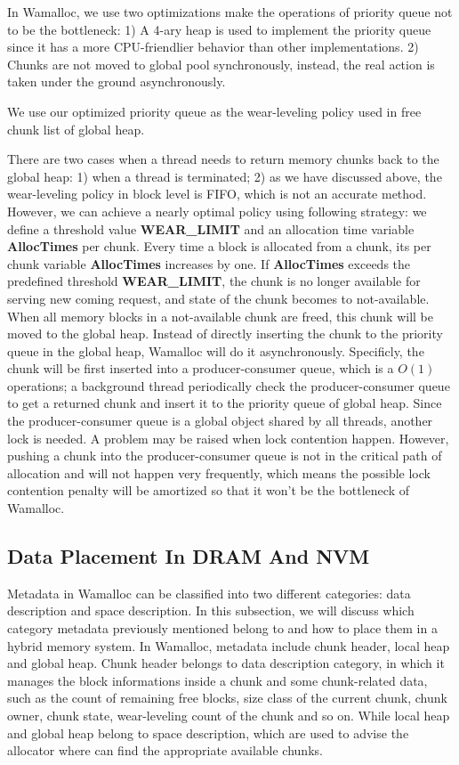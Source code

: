\documentclass[10pt, conference, compsocconf]{IEEEtran}
\begin{document}
In Wamalloc, we use two optimizations make the operations of priority queue not to be the bottleneck:
1) A 4-ary heap is used to implement the priority queue since it has a more CPU-friendlier behavior than other implementations.
2) Chunks are not moved to global pool synchronously, instead, the real action is taken under the ground asynchronously.

We use our optimized priority queue as the wear-leveling policy used in free chunk list of global heap.

There are two cases when a thread needs to return memory chunks back to the global heap: 
1) when a thread is terminated;
2) as we have discussed above, the wear-leveling policy in block level is FIFO, which is not an accurate method.
However, we can achieve a nearly optimal policy using following strategy: 
we define a threshold value \textbf{WEAR\_LIMIT} and an allocation time variable \textbf{AllocTimes} per chunk. 
Every time a block is allocated from a chunk, its per chunk variable \textbf{AllocTimes} increases by one.
If \textbf{AllocTimes} exceeds the predefined threshold \textbf{WEAR\_LIMIT}, 
the chunk is no longer available for serving new coming request, 
and state of the chunk becomes to not-available.
When all memory blocks in a not-available chunk are freed, 
this chunk will be moved to the global heap.
Instead of directly inserting the chunk to the priority queue in the global heap, Wamalloc will do it asynchronously.
Specificly, the chunk will be first inserted into a producer-consumer queue, which is a $O(1)$ operations;
a background thread periodically check the producer-consumer queue to get a returned chunk 
and insert it to the priority queue of global heap.
Since the producer-consumer queue is a global object shared by all threads, another lock is needed.
A problem may be raised when lock contention happen.
However, pushing a chunk into the producer-consumer queue is not in the critical path of allocation 
and will not happen very frequently,
which means the possible lock contention penalty will be amortized so that it won't be the bottleneck of Wamalloc.

\subsection{Data Placement In DRAM And NVM}

Metadata in Wamalloc can be classified into two different categories: data description and space description.
In this subsection, we will discuss which category metadata previously mentioned belong to
and how to place them in a hybrid memory system.
In Wamalloc, metadata include chunk header, local heap and global heap.
Chunk header belongs to data description category, 
in which it manages the block informations inside a chunk and some chunk-related data, 
such as the count of remaining free blocks, size class of the current chunk,
chunk owner, chunk state, wear-leveling count of the chunk and so on.
While local heap and global heap belong to space description,
which are used to advise the allocator where can find the appropriate available chunks.
\end{document}
